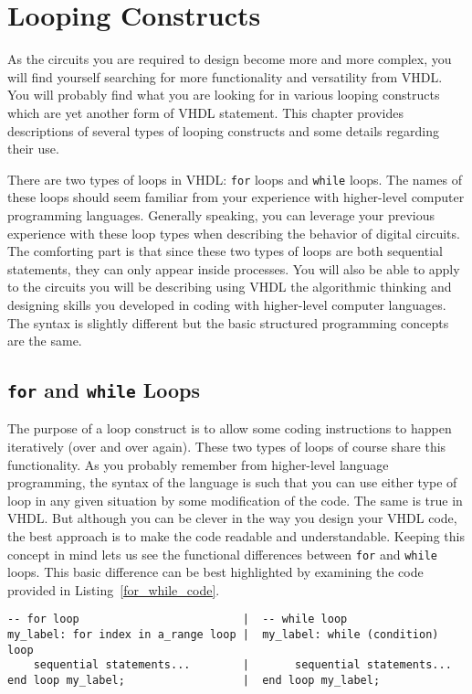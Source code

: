 %
%
\chapter{Looping Constructs}
As the circuits you are required to design become more and more complex, you will find yourself searching for more functionality and versatility from VHDL. You will probably find what you are looking for in various looping constructs which are yet another form of VHDL statement. This chapter provides descriptions of several types of looping constructs and some details regarding their use. 

There are two types of loops in VHDL: \texttt{for} loops and \texttt{while} loops. The names of these loops should seem familiar from your experience with higher-level computer programming languages. Generally speaking, you can leverage your previous experience with these loop types when describing the behavior of digital circuits. The comforting part is that since these two types of loops are both sequential statements, they can only appear inside processes. You will also be able to apply to the circuits you will be describing using VHDL the algorithmic thinking and designing skills you developed in coding with higher-level computer languages. The syntax is slightly different but the basic structured programming concepts are the same. 

\section{\texttt{for} and \texttt{while} Loops}
The purpose of a loop construct is to allow some coding instructions to happen iteratively (over and over again). These two types of loops of course share this functionality. As you probably remember from higher-level language programming, the syntax of the language is such that you can use either type of loop in any given situation by some modification of the code. The same is true in VHDL. But although you can be clever in the way you design your VHDL code, the best approach is to make the code readable and understandable. Keeping this concept in mind lets us see the functional differences between \texttt{for} and \texttt{while} loops. This basic difference can be best highlighted by examining the code provided in Listing~\ref{for_while_code}.

\noindent
\begin{minipage}{0.99\linewidth}
\begin{lstlisting}[label=for_while_code, caption=The basic structure of the \texttt{for} and \texttt{while} loops.]
-- for loop							|  -- while loop
my_label: for index in a_range loop	|  my_label: while (condition) loop
	sequential statements...		|       sequential statements...
end loop my_label;					|  end loop my_label;
\end{lstlisting}
\end{minipage}

